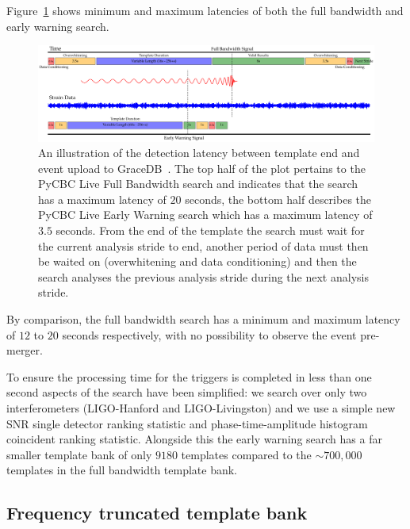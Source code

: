 Figure~\ref{6:fig:latency_plot} shows minimum and maximum latencies of both the full bandwidth and early warning search.
%
\begin{landscape}
\begin{figure}
    \centering
    \includegraphics[width=\columnwidth]{images/6_earlywarning/gw170817/latency_plot_new_font.pdf}
    \caption{An illustration of the detection latency between template end and event upload to GraceDB~\cite{ligo_gracedb:2024}. The top half of the plot pertains to the PyCBC Live Full Bandwidth search and indicates that the search has a maximum latency of $20$ seconds, the bottom half describes the PyCBC Live Early Warning search which has a maximum latency of $3.5$ seconds. From the end of the \gwadj template the search must wait for the current analysis stride to end, another period of data must then be waited on (overwhitening and data conditioning) and then the search analyses the previous analysis stride during the next analysis stride.}
    \label{6:fig:latency_plot}
\end{figure}
\end{landscape}
%
By comparison, the full bandwidth search has a minimum and maximum latency of $12$ to $20$ seconds respectively, with no possibility to observe the event pre-merger.

To ensure the processing time for the triggers is completed in less than one second aspects of the search have been simplified: we search over only two interferometers (LIGO-Hanford and LIGO-Livingston) and we use a simple new SNR single detector ranking statistic and phase-time-amplitude histogram coincident ranking statistic. Alongside this the early warning search has a far smaller template bank of only $9180$ templates compared to the ${\sim}700,000$ templates in the full bandwidth template bank.

\subsection{\label{6:sec:early-warning-template-bank}Frequency truncated template bank}

